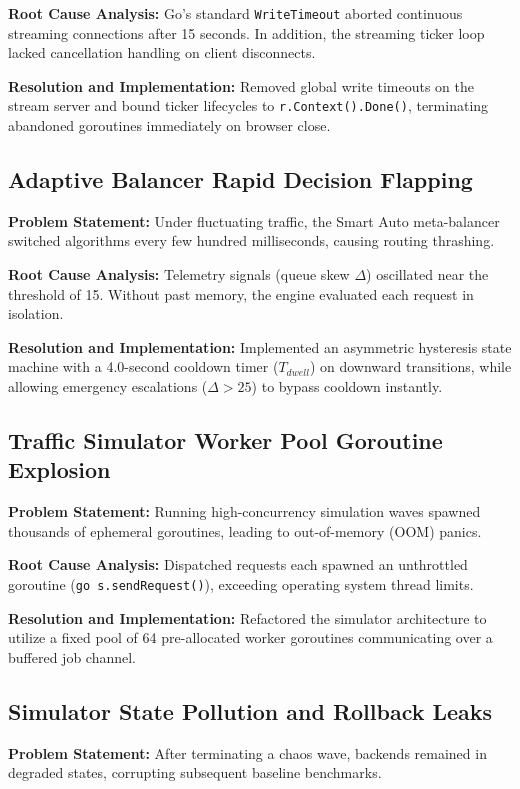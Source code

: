 \documentclass[12pt,openany]{report}
\begin{document}
\textbf{Root Cause Analysis:} Go's standard \texttt{WriteTimeout} aborted continuous streaming connections after 15 seconds. In addition, the streaming ticker loop lacked cancellation handling on client disconnects.

\textbf{Resolution and Implementation:} Removed global write timeouts on the stream server and bound ticker lifecycles to \texttt{r.Context().Done()}, terminating abandoned goroutines immediately on browser close.

\subsection{Adaptive Balancer Rapid Decision Flapping}
\textbf{Problem Statement:} Under fluctuating traffic, the Smart Auto meta-balancer switched algorithms every few hundred milliseconds, causing routing thrashing.

\textbf{Root Cause Analysis:} Telemetry signals (queue skew $\Delta$) oscillated near the threshold of 15. Without past memory, the engine evaluated each request in isolation.

\textbf{Resolution and Implementation:} Implemented an asymmetric hysteresis state machine with a 4.0-second cooldown timer ($T_{dwell}$) on downward transitions, while allowing emergency escalations ($\Delta > 25$) to bypass cooldown instantly.

\subsection{Traffic Simulator Worker Pool Goroutine Explosion}
\textbf{Problem Statement:} Running high-concurrency simulation waves spawned thousands of ephemeral goroutines, leading to out-of-memory (OOM) panics.

\textbf{Root Cause Analysis:} Dispatched requests each spawned an unthrottled goroutine (\texttt{go s.sendRequest()}), exceeding operating system thread limits.

\textbf{Resolution and Implementation:} Refactored the simulator architecture to utilize a fixed pool of 64 pre-allocated worker goroutines communicating over a buffered job channel.

\subsection{Simulator State Pollution and Rollback Leaks}
\textbf{Problem Statement:} After terminating a chaos wave, backends remained in degraded states, corrupting subsequent baseline benchmarks.
\end{document}
